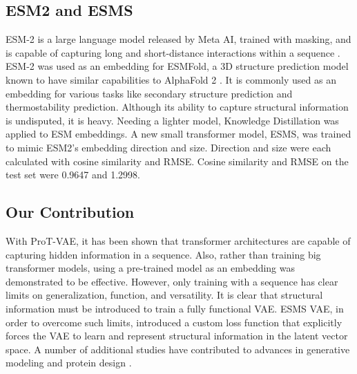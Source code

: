 \documentclass[unnumsec,webpdf,contemporary,medium]{oup-authoring-template}
\begin{document}
\subsection{ESM2 and ESMS}\label{subsec:esm}
ESM-2 is a large language model released by Meta AI, trained with masking, and is capable of capturing long and short-distance interactions within a sequence \cite{rives2021biological}. ESM-2 was used as an embedding for ESMFold, a 3D structure prediction model known to have similar capabilities to AlphaFold 2 \cite{lin2022esmfold, jumper2021highly}. It is commonly used as an embedding for various tasks like secondary structure prediction and thermostability prediction. Although its ability to capture structural information is undisputed, it is heavy. Needing a lighter model, Knowledge Distillation \cite{hinton2015distillingknowledgeneuralnetwork} was applied to ESM embeddings. A new small transformer model, ESMS, was trained to mimic ESM2's embedding direction and size. Direction and size were each calculated with cosine similarity and RMSE. Cosine similarity and RMSE on the test set were 0.9647 and 1.2998.

\subsection{Our Contribution}
With ProT-VAE, it has been shown that transformer architectures are capable of capturing hidden information in a sequence. Also, rather than training big transformer models, using a pre-trained model as an embedding was demonstrated to be effective. However, only training with a sequence has clear limits on generalization, function, and versatility. It is clear that structural information must be introduced to train a fully functional VAE. ESMS VAE, in order to overcome such limits, introduced a custom loss function that explicitly forces the VAE to learn and represent structural information in the latent vector space.
A number of additional studies have contributed to advances in generative modeling and protein design \cite{alley2019unified,anand2022protein,anishchenko2021de,baek2021accurate,devlin2019bert,ferruz2022protein,fowler2014deep,frazer2021disease,greener2022guide,higgins2017beta,hopf2017mutation,ingraham2019generative,kuhlman2000native,madani2020progen,meier2021language,notin2022tranception,rao2019evaluating,rao2021msa,repecka2021expanding,russ2020evolution,sohn2015learning,srivastava2014dropout,strokach2020fast,vaswani2017attention,wu2022high,yang2019machine,zuckerkandl1965molecules}.
\end{document}
